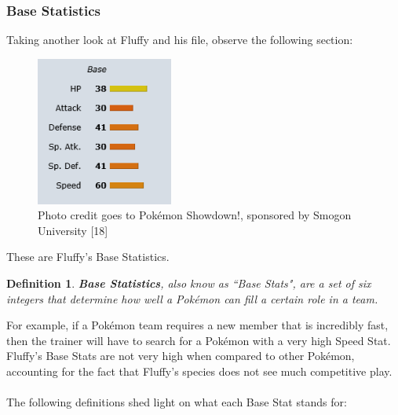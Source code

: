 \documentclass{article}
\newtheorem{definition}{Definition}
\begin{document}
\subsubsection{Base Statistics}
Taking another look at Fluffy and his file, observe the following section:\\
\begin{figure}[H]
	\includegraphics[width=0.4\textwidth]{fluffystats.png}
	\centering
	\caption{Photo credit goes to Pok\'emon Showdown!, sponsored by Smogon University [18]}
\end{figure}
These are Fluffy's Base Statistics. 
\begin{definition}
	\textbf{Base Statistics}, also know as ``Base Stats", are a set of six integers that determine how well a Pok\'emon can fill a certain role in a team.
\end{definition}
For example, if a Pok\'emon team requires a new member that is incredibly fast, then the trainer will have to search for a Pok\'emon with a very high Speed Stat. Fluffy's Base Stats are not very high when compared to other Pok\'emon, accounting for the fact that Fluffy's species does not see much competitive play.\\\\
The following definitions shed light on what each Base Stat stands for:
\end{document}
